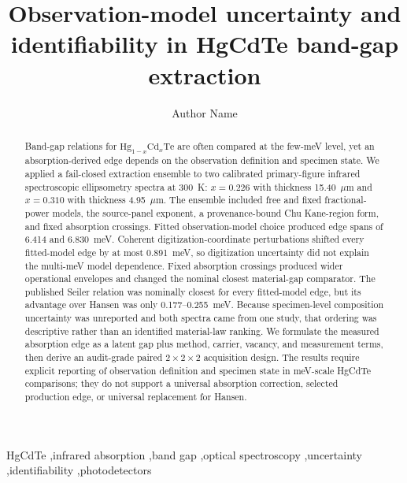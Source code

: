 \title{Observation-model uncertainty and identifiability in HgCdTe band-gap extraction}

\author[aff1]{Author Name}

\begin{abstract}
Band-gap relations for $\mathrm{Hg}_{1-x}\mathrm{Cd}_{x}\mathrm{Te}$ are often compared at the few-meV level, yet an absorption-derived edge depends on the observation definition and specimen state. We applied a fail-closed extraction ensemble to two calibrated primary-figure infrared spectroscopic ellipsometry spectra at 300~K: $x=0.226$ with thickness 15.40~$\mu$m and $x=0.310$ with thickness 4.95~$\mu$m. The ensemble included free and fixed fractional-power models, the source-panel exponent, a provenance-bound Chu Kane-region form, and fixed absorption crossings. Fitted observation-model choice produced edge spans of 6.414 and 6.830~meV. Coherent digitization-coordinate perturbations shifted every fitted-model edge by at most 0.891~meV, so digitization uncertainty did not explain the multi-meV model dependence. Fixed absorption crossings produced wider operational envelopes and changed the nominal closest material-gap comparator. The published Seiler relation was nominally closest for every fitted-model edge, but its advantage over Hansen was only 0.177--0.255~meV. Because specimen-level composition uncertainty was unreported and both spectra came from one study, that ordering was descriptive rather than an identified material-law ranking. We formulate the measured absorption edge as a latent gap plus method, carrier, vacancy, and measurement terms, then derive an audit-grade paired $2\times2\times2$ acquisition design. The results require explicit reporting of observation definition and specimen state in meV-scale HgCdTe comparisons; they do not support a universal absorption correction, selected production edge, or universal replacement for Hansen.
\end{abstract}

\begin{keyword}
HgCdTe \sep infrared absorption \sep band gap \sep optical spectroscopy \sep uncertainty \sep identifiability \sep photodetectors
\end{keyword}
